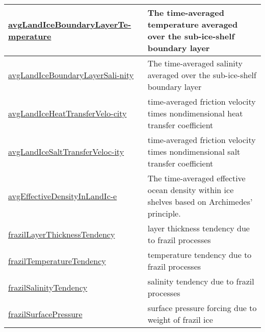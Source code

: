 {\begin{center}
\begin{longtable}{| p{2.0in} | p{4.0in} |}
    \hline
    \hyperref[subsec:var_sec_forcing_avgLandIceBoundaryLayerTemperature]{avgLandIceBoundaryLayerTe-}\hyperref[subsec:var_sec_forcing_avgLandIceBoundaryLayerTemperature]{mperature}  & The time-averaged temperature averaged over the sub-ice-shelf boundary layer \\
    \hline
    \hyperref[subsec:var_sec_forcing_avgLandIceBoundaryLayerSalinity]{avgLandIceBoundaryLayerSali-}\hyperref[subsec:var_sec_forcing_avgLandIceBoundaryLayerSalinity]{nity}  & The time-averaged salinity averaged over the sub-ice-shelf boundary layer \\
    \hline
    \hyperref[subsec:var_sec_forcing_avgLandIceHeatTransferVelocity]{avgLandIceHeatTransferVelo-}\hyperref[subsec:var_sec_forcing_avgLandIceHeatTransferVelocity]{city}  & time-averaged friction velocity times nondimensional heat transfer coefficient \\
    \hline
    \hyperref[subsec:var_sec_forcing_avgLandIceSaltTransferVelocity]{avgLandIceSaltTransferVeloc-}\hyperref[subsec:var_sec_forcing_avgLandIceSaltTransferVelocity]{ity}  & time-averaged friction velocity times nondimensional salt transfer coefficient \\
    \hline
    \hyperref[subsec:var_sec_forcing_avgEffectiveDensityInLandIce]{avgEffectiveDensityInLandIc-}\hyperref[subsec:var_sec_forcing_avgEffectiveDensityInLandIce]{e  }& The time-averaged effective ocean density within ice shelves based on Archimedes' principle. \\
    \hline
    \hyperref[subsec:var_sec_forcing_frazilLayerThicknessTendency]{frazilLayerThicknessTendency} & layer thickness tendency due to frazil processes \\
    \hline
    \hyperref[subsec:var_sec_forcing_frazilTemperatureTendency]{frazilTemperatureTendency} & temperature tendency due to frazil processes \\
    \hline
    \hyperref[subsec:var_sec_forcing_frazilSalinityTendency]{frazilSalinityTendency} & salinity tendency due to frazil processes \\
    \hline
    \hyperref[subsec:var_sec_forcing_frazilSurfacePressure]{frazilSurfacePressure} & surface pressure forcing due to weight of frazil ice \\
    \hline
\end{longtable}
\end{center}
}
